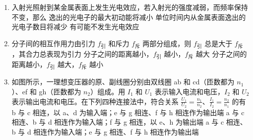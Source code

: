 \documentclass[\gkver]{gaokaozhenti}
\begin{document}
\begin{enumerate}
\item
入射光照射到某金属表面上发生光电效应，若入射光的强度减弱，而频率保持不变，那么
{逸出的光电子的最大初动能将减小}
{单位时间内从金属表面逸出的光电子数目将减少}
{有可能不发生光电效应}


\item
分子间的相互作用力由引力 $f_{\text{引}}$ 和斥力 $f_{\text{斥}}$ 两部分组成，则
{$f_{\text{引}}$ 总是大于 $f_{\text{斥}}$，其合力总表现为引力}
{分子之间的距离越小，$f_{\text{引}}$ 越小，$f_{\text{斥}}$ 越大}
{分子之间的距离越小，$f_{\text{引}}$ 越大，$f_{\text{斥}}$ 越小}


\item
如图所示，一理想变压器的原、副线圈分别由双线圈 ab 和 cd（匝数都为 $n_{1}$）、ef 和 gh（匝数都为 $n_{2}$）组成。用 $I_{1}$ 和 $U_{1}$ 表示输入电流和电压，$I_{2}$ 和 $U_{2}$ 表示输出电流和电压。在下列四种连接法中，符合关系 $\frac{U_{1}}{U_{2}}=\frac{n_{1}}{n_{2}}$、$\frac{I_{1}}{I_{2}}=\frac{n_{2}}{n_{1}}$ 的有
{b 与 c 相连，以 a、d 为输入端；e 与 g 相连、f 与 h 相连作为输出端}
{a 与 c 相连、b 与 d 相连作为输入端；f 与 g 相连，以 e、h 为输出端}
{a 与 c 相连、b 与 d 相连作为输入端；e 与 g 相连、f 与 h 相连作为输出端}


\end{enumerate}
\end{document}
